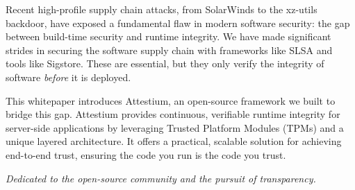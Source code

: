 {\begin{titlepage}
  \vspace{0.8em}

  \begin{flushleft}
  \setlength{\parindent}{2em}
  \setlength{\parskip}{0.4em}
  Recent high-profile supply chain attacks, from SolarWinds to the xz-utils backdoor, have exposed a fundamental flaw in modern software security: the gap between build-time security and runtime integrity. We have made significant strides in securing the software supply chain with frameworks like SLSA and tools like Sigstore. These are essential, but they only verify the integrity of software \textit{before} it is deployed.

  This whitepaper introduces Attestium, an open-source framework we built to bridge this gap. Attestium provides continuous, verifiable runtime integrity for server-side applications by leveraging Trusted Platform Modules (TPMs) and a unique layered architecture. It offers a practical, scalable solution for achieving end-to-end trust, ensuring the code you run is the code you trust.
  \end{flushleft}

  \vfill

  {\fontsize{8}{10}\selectfont \textit{Dedicated to the open-source community and the pursuit of transparency.}\par}

  \end{titlepage}
}
